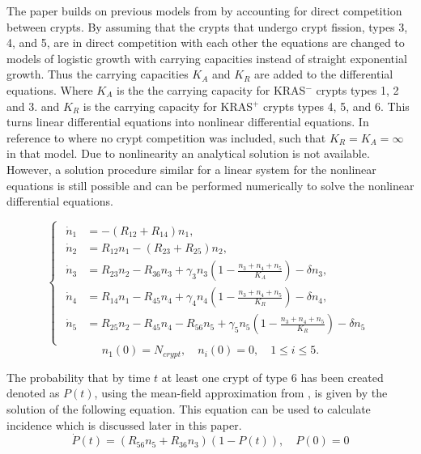 The paper builds on previous models from \autocite{OtherMathModel} by accounting for direct competition between crypts. By assuming that the crypts that undergo crypt fission, types 3, 4, and 5, are in direct competition with each other the equations are changed to models of logistic growth with carrying capacities instead of straight exponential growth. 
Thus the carrying capacities $K_A$ and $K_R$ are added to the differential equations. Where $K_A$ is the the carrying capacity for KRAS$^-$ crypts types 1, 2 and 3. and $K_R$ is the carrying capacity for KRAS$^+$ crypts types 4, 5, and 6. This turns linear differential equations into nonlinear differential equations.
In reference to 
\autocite{OtherMathModel} where no crypt competition was included, such that $K_R = K_A = \infty$ in that model.
Due to nonlinearity an analytical solution is not available. However, a solution procedure similar for a linear system for the nonlinear equations is still possible and can be performed numerically to solve the nonlinear differential equations.

\begin{equation}
\begin{cases}
\begin{aligned}
    \dot{n}_1 &= -(R_{12} + R_{14})n_1, \\
    \dot{n}_2 &= R_{12}n_1 - (R_{23} + R_{25})n_2, \\
    \dot{n}_3 &= R_{23}n_2 - R_{36}n_3 + \gamma_3 n_3 \left( 1- \frac{n_3+n_4+n_5}{K_A} \right) - \delta n_3, \\
    \dot{n}_4 &= R_{14}n_1 - R_{45}n_4 + \gamma_4 n_4 \left( 1- \frac{n_3+n_4+n_5}{K_R} \right) - \delta n_4, \\
    \dot{n}_5 &= R_{25}n_2 - R_{45}n_4 - R_{56}n_5 +  \gamma_5 n_5 \left( 1- \frac{n_3+n_4+n_5}{K_R} \right) - \delta n_5\\
\end{aligned}
\end{cases}
\end{equation}
\[n_1(0) = N_{crypt},\quad n_i(0) = 0, \quad1 \leq i \leq 5.\]

The probability that by time $t$ at least one crypt of type 6 has been created denoted as $P(t)$, using the mean-field approximation from \autocite{AspirinForTheChemopreventionOfColorectalAdenomas}, is given by the solution of the following equation. This equation can be used to calculate incidence which is discussed later in this paper.
\[ \dot{P}(t) = \left(R_{56}n_5 + R_{36}n_3 \right) \left(1 - P(t) \right), \quad P(0) = 0 \]



